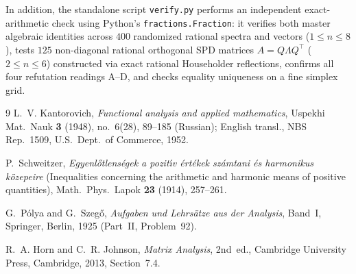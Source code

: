 \documentclass[11pt,a4paper]{article}
\theoremstyle{definition}
\begin{document}
In addition, the standalone script \texttt{verify.py} performs an independent
exact-arithmetic check using Python's \texttt{fractions.Fraction}: it verifies
both master algebraic identities across $400$ randomized rational spectra and
vectors ($1 \le n \le 8$), tests $125$ non-diagonal rational orthogonal SPD
matrices $A = Q\Lambda Q^\top$ ($2 \le n \le 6$) constructed via exact rational
Householder reflections, confirms all four refutation readings A--D, and checks
equality uniqueness on a fine simplex grid.

\begin{thebibliography}{9}
L.~V. Kantorovich, \emph{Functional analysis and applied mathematics}, Uspekhi
Mat.\ Nauk \textbf{3} (1948), no.~6(28), 89--185 (Russian); English transl.,
NBS Rep.\ 1509, U.S.\ Dept.\ of Commerce, 1952.

P.~Schweitzer, \emph{Egyenl\H{o}tlens\'egek a pozit\'{\i}v \'ert\'ekek
sz\'amtani \'es harmonikus k\"ozepeire} (Inequalities concerning the arithmetic
and harmonic means of positive quantities), Math.\ Phys.\ Lapok \textbf{23}
(1914), 257--261.

G.~P\'olya and G.~Szeg\H{o}, \emph{Aufgaben und Lehrs\"atze aus der Analysis},
Band~I, Springer, Berlin, 1925 (Part~II, Problem~92).

R.~A. Horn and C.~R. Johnson, \emph{Matrix Analysis}, 2nd~ed., Cambridge
University Press, Cambridge, 2013, Section~7.4.
\end{thebibliography}
\end{document}
